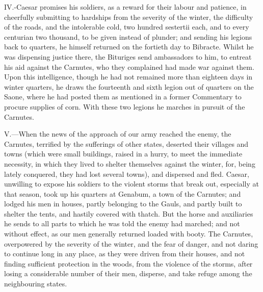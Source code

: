 IV.-Caesar promises his soldiers, as a reward for their labour and
patience, in cheerfully submitting to hardships from the severity of the
winter, the difficulty of the roads, and the intolerable cold, two
hundred sestertii each, and to every centurian two thousand, to be given
instead of plunder; and sending his legions back to quarters, he himself
returned on the fortieth day to Bibracte. Whilst he was dispensing
justice there, the Bituriges send ambassadors to him, to entreat his aid
against the Carnutes, who they complained had made war against them.
Upon this intelligence, though he had not remained more than eighteen
days in winter quarters, he draws the fourteenth and sixth legion out of
quarters on the Saone, where he had posted them as mentioned in a former
Commentary to procure supplies of corn. With these two legions he
marches in pursuit of the Carnutes.

V.—When the news of the approach of our army reached the enemy, the
Carnutes, terrified by the sufferings of other states, deserted their
villages and towns (which were small buildings, raised in a hurry, to
meet the immediate necessity, in which they lived to shelter themselves
against the winter, for, being lately conquered, they had lost several
towns), and dispersed and fled. Caesar, unwilling to expose his soldiers
to the violent storms that break out, especially at that season, took up
his quarters at Genabum, a town of the Carnutes; and lodged his men in
houses, partly belonging to the Gauls, and partly built to shelter the
tents, and hastily covered with thatch. But the horse and auxiliaries he
sends to all parts to which he was told the enemy had marched; and not
without effect, as our men generally returned loaded with booty. The
Carnutes, overpowered by the severity of the winter, and the fear of
danger, and not daring to continue long in any place, as they were
driven from their houses, and not finding sufficient protection in the
woods, from the violence of the storms, after losing a considerable
number of their men, disperse, and take refuge among the neighbouring
states.

